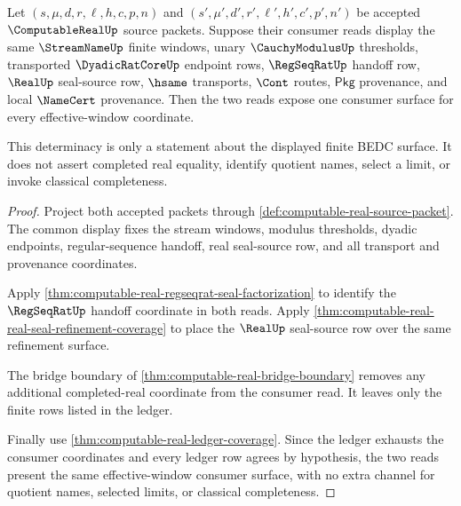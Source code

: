 \begin{theorem}
\label{thm:computable-real-effective-window-determinacy}
Let $(s,\mu,d,r,\ell,h,c,p,n)$ and
$(s',\mu',d',r',\ell',h',c',p',n')$ be accepted
$\ComputableRealUp$ source packets. Suppose their consumer reads display the
same $\StreamNameUp$ finite windows, unary $\CauchyModulusUp$ thresholds,
transported $\DyadicRatCoreUp$ endpoint rows, $\RegSeqRatUp$ handoff row,
$\RealUp$ seal-source row, $\hsame$ transports, $\Cont$ routes,
$\mathsf{Pkg}$ provenance, and local $\NameCert$ provenance. Then the two
reads expose one consumer surface for every effective-window coordinate.

This determinacy is only a statement about the displayed finite BEDC surface.
It does not assert completed real equality, identify quotient names, select a
limit, or invoke classical completeness.
\end{theorem}
\begin{proof}
Project both accepted packets through
\autoref{def:computable-real-source-packet}. The common display fixes the
stream windows, modulus thresholds, dyadic endpoints, regular-sequence
handoff, real seal-source row, and all transport and provenance coordinates.

Apply \autoref{thm:computable-real-regseqrat-seal-factorization} to identify
the $\RegSeqRatUp$ handoff coordinate in both reads. Apply
\autoref{thm:computable-real-real-seal-refinement-coverage} to place the
$\RealUp$ seal-source row over the same refinement surface.

The bridge boundary of \autoref{thm:computable-real-bridge-boundary} removes
any additional completed-real coordinate from the consumer read. It leaves
only the finite rows listed in the ledger.

Finally use \autoref{thm:computable-real-ledger-coverage}. Since the ledger
exhausts the consumer coordinates and every ledger row agrees by hypothesis,
the two reads present the same effective-window consumer surface, with no
extra channel for quotient names, selected limits, or classical completeness.
\end{proof}

